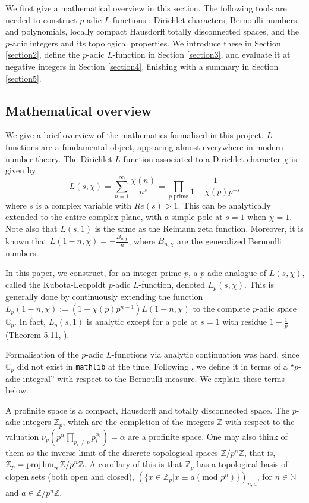 \documentclass[a4paper,UKenglish,cleveref, autoref, thm-restate]{lipics-v2021}
\newcommand{\lean}[1]{\texttt{#1}\xspace} %
\begin{document}
We first give a mathematical overview in this section. The following tools are needed to construct $p$-adic $L$-functions : Dirichlet characters, Bernoulli numbers and polynomials, locally compact Hausdorff totally
disconnected spaces, and the $p$-adic integers and its topological properties.
We introduce these in Section \ref{section2}, define the $p$-adic $L$-function in Section \ref{section3}, and evaluate it at negative integers in Section \ref{section4}, finishing with a summary in Section \ref{section5}. 
\subsection{Mathematical overview}
We give a brief overview of the mathematics formalised in this project. 
$L$-functions are a fundamental object, appearing almost everywhere in modern 
number theory. The Dirichlet $L$-function associated to a Dirichlet character $\chi$ is given by  
$$ L(s, \chi) = \sum_{n = 1}^{\infty} \frac{\chi (n)}{n^s} = \prod_{p \text{ prime}} \frac{1}{1 - \chi (p) p^{-s}}$$
where $s$ is a complex variable with $Re(s) > 1$. This can be analytically extended 
to the entire complex plane, with a simple pole at $s = 1$ when $\chi = 1$. Note also 
that $L(s, 1)$ is the same as the Reimann zeta function. Moreover, it is known that 
$L(1 - n, \chi) = - \frac{B_{n, \chi}}{n}$, where $B_{n, \chi}$ are the generalized 
Bernoulli numbers. 

In this paper, we construct, for an integer prime $p$, a $p$-adic analogue of $L(s, \chi)$, 
called the Kubota-Leopoldt $p$-adic $L$-function, denoted $L_p(s, \chi)$. This is generally done by continuously extending the function 
$L_p(1 - n, \chi) := (1 - \chi (p) p^{n - 1}) L(1 - n, \chi)$ to the complete $p$-adic space 
$\mathbb{C}_p$. In fact, $L_p(s, 1)$ is analytic except for a pole at $s = 1$ with residue 
$1 - \frac{1}{p}$ (Theorem 5.11, \cite{cyc}). 

Formalisation of the $p$-adic $L$-functions via analytic continuation was hard, since $\mathbb{C}_p$ did not exist 
in \lean{mathlib} at the time. Following \cite{cyc}, 
we define it in terms of a ``$p$-adic integral'' with respect to the Bernoulli measure. We explain these terms below. 

A profinite space is a compact, Hausdorff and totally disconnected space. The $p$-adic integers 
$\mathbb{Z}_p$, which are the completion of the integers $\mathbb{Z}$ with respect to the 
valuation $\nu_p(p^{\alpha} \prod_{p_i \ne p} p_i^{\alpha_i}) = \alpha$ are a profinite space. 
One may also think of them as the inverse limit of the discrete topological spaces 
$\mathbb{Z} / p^{n} \mathbb{Z}$, that is, $\mathbb{Z}_p = \projlim_{n} \mathbb{Z} / p^{n} \mathbb{Z}$. 
A corollary of this is that $\mathbb{Z}_p$ has a topological basis of clopen sets (both open and closed), 
$(\{ x \in \mathbb{Z}_p | x \equiv a (\text{mod } p^n) \})_{n, a}$, for $n \in \mathbb{N}$ and $a \in \mathbb{Z} / p^{n} \mathbb{Z}$. 
\end{document}
